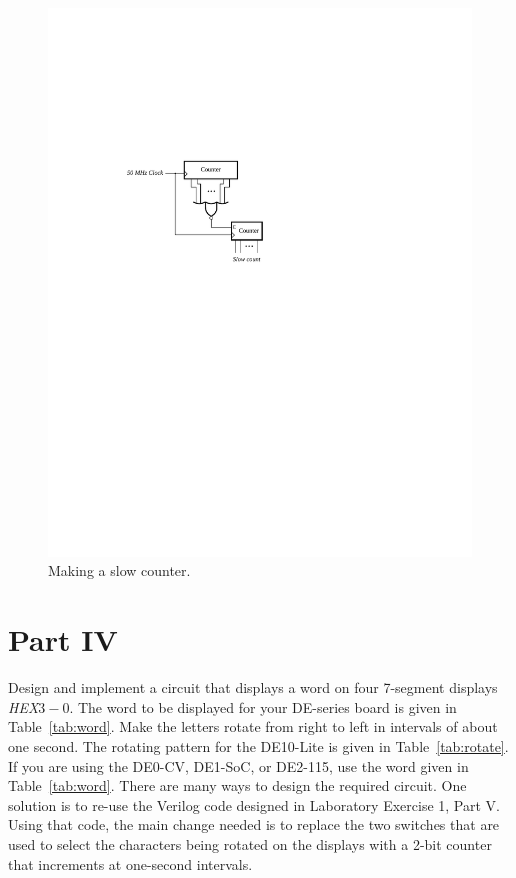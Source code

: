 \documentclass[epsfig,10pt,fullpage]{article}
\begin{document}
\begin{figure}[H]
	\begin{center}
		\includegraphics[]{figures/figure_hint.pdf}
	\end{center}
\caption{Making a slow counter.}
\label{fig:hint}
\end{figure}

\section*{Part IV}
Design and implement a circuit that displays a word on four 7-segment displays {\it HEX}$3-0$.
The word to be displayed for your DE-series board is given in Table~\ref{tab:word}.
Make the letters rotate from right to left in intervals of about one second.
The rotating pattern for the DE10-Lite is given in Table~\ref{tab:rotate}.
If you are using the DE0-CV, DE1-SoC, or DE2-115, use the word given in Table~\ref{tab:word}.
There are many ways to design the required circuit. One solution is to re-use the Verilog code 
designed in Laboratory Exercise 1, Part V. Using that code, the main change needed is to 
replace the two switches that are used to select the characters being rotated on the displays
with a 2-bit counter that increments at one-second intervals.
\end{document}
